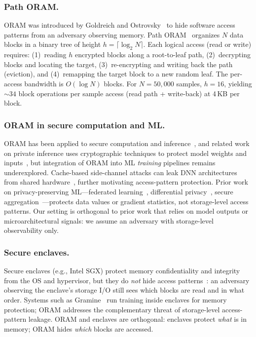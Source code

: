 \documentclass{llncs}
\begin{document}
\subsubsection{Path ORAM.}
ORAM was introduced by Goldreich and Ostrovsky~\cite{goldreich1996} to hide software access patterns from an adversary observing memory.
Path ORAM~\cite{stefanov2013} organizes $N$ data blocks in a binary tree of height $h = \lceil \log_2 N \rceil$.
Each logical access (read or write) requires: (1)~reading $h$ encrypted blocks along a root-to-leaf path, (2)~decrypting blocks and locating the target, (3)~re-encrypting and writing back the path (eviction), and (4)~remapping the target block to a new random leaf.
The per-access bandwidth is $O(\log N)$ blocks.
For $N = 50{,}000$ samples, $h = 16$, yielding ${\sim}34$ block operations per sample access (read path + write-back) at 4\,KB per block.

\subsubsection{ORAM in secure computation and ML.}
ORAM has been applied to secure computation and inference~\cite{goldreich1996,stefanov2013}, and related work on private inference uses cryptographic techniques to protect model weights and inputs~\cite{tramer2019,juvekar2018}, but integration of ORAM into ML \emph{training} pipelines remains underexplored.
Cache-based side-channel attacks can leak DNN architectures from shared hardware~\cite{yan2020}, further motivating access-pattern protection.
Prior work on privacy-preserving ML---federated learning~\cite{mcmahan2017}, differential privacy~\cite{dwork2006}, secure aggregation~\cite{bonawitz2017}---protects data values or gradient statistics, not storage-level access patterns.
Our setting is orthogonal to prior work that relies on model outputs or microarchitectural signals: we assume an adversary with storage-level observability only.

\subsubsection{Secure enclaves.}
Secure enclaves (e.g., Intel SGX) protect memory confidentiality and integrity from the OS and hypervisor, but they do \emph{not} hide access patterns~\cite{xu2015}: an adversary observing the enclave's storage I/O still sees which blocks are read and in what order.
Systems such as Gramine~\cite{gramine2022} run training inside enclaves for memory protection; ORAM addresses the complementary threat of storage-level access-pattern leakage.
ORAM and enclaves are orthogonal: enclaves protect \emph{what} is in memory; ORAM hides \emph{which} blocks are accessed.
\end{document}
